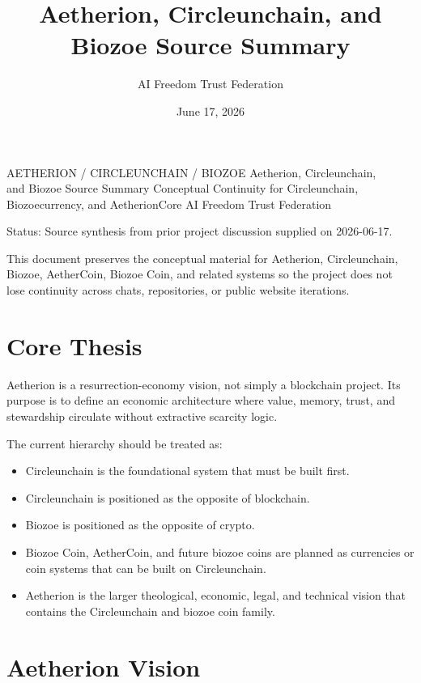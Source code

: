 ﻿\documentclass[12pt]{article}
\title{Aetherion, Circleunchain, and Biozoe Source Summary}
\author{AI Freedom Trust Federation}
\date{June 17, 2026}
\begin{document}
\aftTitlePage
  {AETHERION / CIRCLEUNCHAIN / BIOZOE}
  {Aetherion, Circleunchain,\\and Biozoe Source Summary}
  {Conceptual Continuity for Circleunchain, Biozoecurrency, and AetherionCore}
  {AI Freedom Trust Federation}

\tableofcontents
\newpage


Status: Source synthesis from prior project discussion supplied on 2026-06-17.

This document preserves the conceptual material for Aetherion, Circleunchain, Biozoe, AetherCoin, Biozoe Coin, and related systems so the project does not lose continuity across chats, repositories, or public website iterations.

\section{Core Thesis}


Aetherion is a resurrection-economy vision, not simply a blockchain project. Its purpose is to define an economic architecture where value, memory, trust, and stewardship circulate without extractive scarcity logic.

The current hierarchy should be treated as:

\begin{itemize}
  \item Circleunchain is the foundational system that must be built first.
\end{itemize}
\begin{itemize}
  \item Circleunchain is positioned as the opposite of blockchain.
\end{itemize}
\begin{itemize}
  \item Biozoe is positioned as the opposite of crypto.
\end{itemize}
\begin{itemize}
  \item Biozoe Coin, AetherCoin, and future biozoe coins are planned as currencies or coin systems that can be built on Circleunchain.
\end{itemize}
\begin{itemize}
  \item Aetherion is the larger theological, economic, legal, and technical vision that contains the Circleunchain and biozoe coin family.
\end{itemize}

\section{Aetherion Vision}
\end{document}
